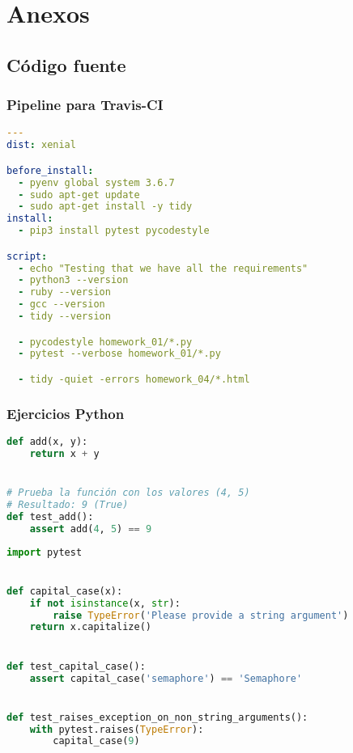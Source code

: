 \chapter{Anexos}

\section{Código fuente}

\subsection{Pipeline para Travis-CI}

\begin{lstlisting}[language=yaml]
---
dist: xenial

before_install:
  - pyenv global system 3.6.7
  - sudo apt-get update
  - sudo apt-get install -y tidy
install:
  - pip3 install pytest pycodestyle

script:
  - echo "Testing that we have all the requirements"
  - python3 --version
  - ruby --version
  - gcc --version
  - tidy --version

  - pycodestyle homework_01/*.py
  - pytest --verbose homework_01/*.py

  - tidy -quiet -errors homework_04/*.html
\end{lstlisting}

\subsection{Ejercicios Python}
\begin{lstlisting}[language=python]
def add(x, y):
    return x + y


# Prueba la función con los valores (4, 5)
# Resultado: 9 (True)
def test_add():
    assert add(4, 5) == 9
\end{lstlisting}

\begin{lstlisting}[language=python]
import pytest


def capital_case(x):
    if not isinstance(x, str):
        raise TypeError('Please provide a string argument')
    return x.capitalize()


def test_capital_case():
    assert capital_case('semaphore') == 'Semaphore'


def test_raises_exception_on_non_string_arguments():
    with pytest.raises(TypeError):
        capital_case(9)
\end{lstlisting}

